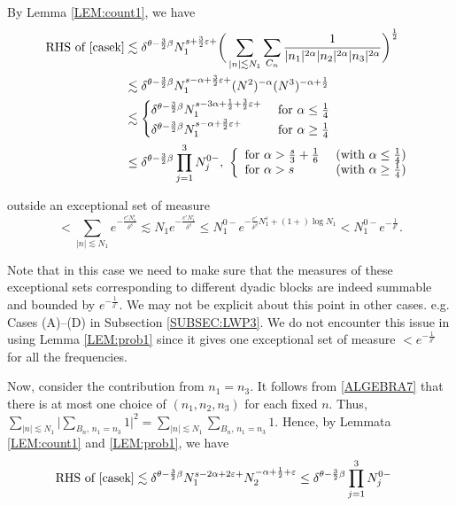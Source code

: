 \documentclass[11pt]{amsart}
\numberwithin{equation}{section} \numberwithin{theorem}{section}
\begin{document}
{
\noindent} By Lemma \ref{LEM:count1}, we have 
\begin{align*}
	\text{RHS of } \eqref{casek} & \lesssim {\delta}^{\theta-\frac{3}{2}\beta} N_1^{s+\frac{3}{2}{\varepsilon}+} \bigg( \sum_{|n| \lesssim N_1} \sum_{C_n} \frac{1}{|n_1|^{2{\alpha}}|n_2|^{2{\alpha}}|n_3|^{2{\alpha}}} \bigg)^\frac{1}{2}\\
	& \lesssim {\delta}^{\theta-\frac{3}{2}\beta} N_1^{s -{\alpha} +\frac{3}{2}{\varepsilon}+} (N^2)^{-{\alpha}} (N^3)^{-{\alpha}+\frac{1}{2}} \\
	& \lesssim 
	\begin{cases}
		{\delta}^{\theta-\frac{3}{2}\beta} N_1^{s -3{\alpha} + \frac{1}{2} +\frac{3}{2}{\varepsilon}+} & \text{ for } {\alpha} \leq \frac{1}{4} \\
		{\delta}^{\theta-\frac{3}{2}\beta} N_1^{s -{\alpha} +\frac{3}{2}{\varepsilon}+} & \text{ for }{\alpha} \geq \frac{1}{4} 
	\end{cases}
	\\
	& \leq {\delta}^{\theta-\frac{3}{2}\beta} \prod_{j = 1}^3 N_j^{0-}, \ \left\{
	\begin{array}{ll}
		\text{for } {\alpha} > \frac{s}{3} + \frac{1}{6} & \text{ (with } {\alpha} \leq \frac{1}{4}) \\
		\text{for } {\alpha} > s & \text{ (with }{\alpha} \geq \frac{1}{4}) 
	\end{array}
	\right. \notag 
\end{align*}

{
\noindent} outside an exceptional set of measure
\begin{equation}
\label{EXCEPT1}
< \sum_{|n| \lesssim N_1} e^{-\frac{c'N_1^{\varepsilon}}{{\delta}^\beta}} \lesssim N_1 e^{-\frac{c'N_1^{\varepsilon}}{{\delta}^\beta}} \leq N_1^{0-} e^{-\frac{c'}{{\delta}^\beta} N_1^{\varepsilon} +(1+) \log N_1} < N_1^{0-} e^{-\frac{1}{{\delta}^{c}}}.
\end{equation}

{
\noindent} Note that in this case we need to make sure that the measures of these exceptional sets corresponding to different dyadic blocks are indeed summable and bounded by $e^{-\frac{1}{{\delta}^c}}$. We may not be explicit about this point in other cases. e.g. Cases (A)--(D) in Subsection \ref{SUBSEC:LWP3}. We do not encounter this issue in using Lemma \ref{LEM:prob1} since it gives one exceptional set of measure $<e^{-\frac{1}{{\delta}^c}}$ for all the frequencies.

Now, consider the contribution from $n_1 = n_3$. It follows from \eqref{ALGEBRA7} that there is at most one choice of $(n_1, n_2, n_3)$ for each fixed $n$. Thus, $\sum_{|n| \lesssim N_1} \big|\sum_{B_n, \, n_1 = n_3} 1\big|^2 = \sum_{|n| \lesssim N_1} \sum_{B_n, \, n_1 = n_3} 1$. Hence, by Lemmata \ref{LEM:count1} and \ref{LEM:prob1}, we have 
\begin{align}
	\text{RHS of } \eqref{casek} & \lesssim {\delta}^{\theta-\frac{3}{2}\beta} N_1^{s -2{\alpha} + 2{\varepsilon}+} N_2^{-{\alpha} + \frac{1}{2} + {\varepsilon}} \leq {\delta}^{\theta-\frac{3}{2}\beta}\prod_{j = 1}^3 N_j^{0-} 
	\label{ZK}
\end{align}
\end{document}
